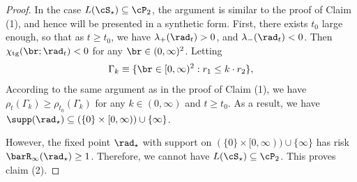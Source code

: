 \documentclass[11pt]{article}
\begin{document}
\begin{proof}
In the case $L(\cS_\star) \subseteq \cP_2$, the argument is similar to the proof of Claim (1), and hence will be presented in a synthetic form. First, there exists $t_0$ large enough, so that as $t \ge t_0$, we have $\lambda_+(\rad_t) > 0$, and $\lambda_-(\rad_t) < 0$. Then $\chi_{\rm tg}(\br; \rad_t) < 0$ for any $\br \in (0, \infty)^2$. Letting
\begin{equation}\label{eqn:Gamma_area_in_anisotropic_proof_case2}
\Gamma_k \equiv \{\br \in [0, \infty)^2: r_1 \le k \cdot r_2 \},
\end{equation}
According to the same argument as in the proof of Claim (1), we have $\rho_t(\Gamma_k) \ge \rho_{t_0}(\Gamma_k)$ for any $k \in (0, \infty)$ and $t \ge t_0$. As a result, we have $\supp(\rad_\star) \subseteq (\{0\} \times [0, \infty)) \cup \{\infty\}$. 

However, the fixed point $\rad_\star$ with support on $(\{0\} \times [0, \infty)) \cup \{\infty\}$ has risk $\barR_\infty(\rad_\star) \ge 1$. Therefore, we cannot have $L(\cS_\star) \subseteq \cP_2$. This proves claim (2). 


\end{proof}
\end{document}
